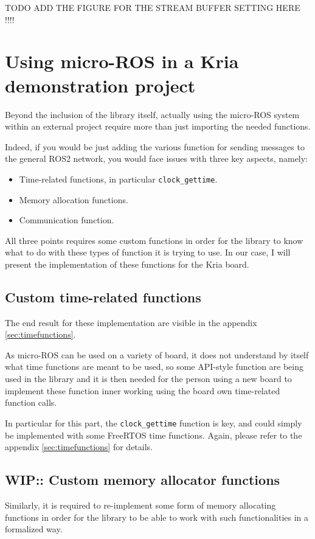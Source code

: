 \documentclass[10pt]{article}
\begin{document}
TODO ADD THE FIGURE FOR THE STREAM BUFFER SETTING HERE !!!!

\section{Using micro-ROS in a Kria demonstration project}
Beyond the inclusion of the library itself, actually using the micro-ROS system
within an external project require more than just importing the needed
functions.

Indeed, if you would be just adding the various function for sending messages to
the general ROS2 network, you would face issues with three key aspects, namely:
\begin{itemize}
\item Time-related functions, in particular \verb|clock_gettime|.
\item Memory allocation functions.
\item Communication function.
\end{itemize}

All three points requires some custom functions in order for the library to
know what to do with these types of function it is trying to use.
In our case, I will present the implementation of these functions for the
Kria board.

\subsection{Custom time-related functions}
The end result for these implementation are visible in the appendix
\ref{sec:timefunctions}.

As micro-ROS can be used on a variety of board, it does not understand by itself
what time functions are meant to be used, so some API-style function are being
used in the library and it is then needed for the person using a new board
to implement these function inner working using the board own time-related
function calls.

In particular for this part, the \verb|clock_gettime| function is key, and could
simply be implemented with some FreeRTOS time functions.
Again, please refer to the appendix \ref{sec:timefunctions} for details.

\subsection{WIP:: Custom memory allocator functions}
Similarly, it is required to re-implement some form of memory allocating
functions in order for the library to be able to work with such functionalities
in a formalized way.
\end{document}
